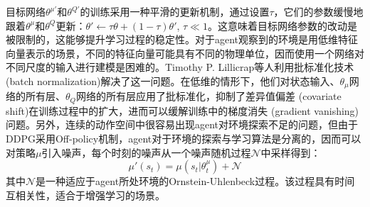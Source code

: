 目标网络$\theta^{\mu'}$和$\theta^{Q'}$的训练采用一种平滑的更新机制，通过设置$\tau$，它们的参数缓慢地跟着$\theta^{\mu}$和$\theta^{Q}$更新：$\theta' \leftarrow \tau\theta + (1 - \tau) \theta'$, $\tau \ll 1$。这意味着目标网络参数的改动是被限制的，这能够提升学习过程的稳定性\cite{timothy2016cont}。对于agent观察到的环境是用低维特征向量表示的场景，不同的特征向量可能具有不同的物理单位，因而使用一个网络对不同尺度的输入进行建模是困难的。Timothy P. Lillicrap等人利用批标准化技术 (batch normalization\cite{ioffe2015batch})解决了这一问题。在低维的情形下，他们对状态输入、$\theta_\mu$网络的所有层、$\theta_Q$网络的所有层应用了批标准化，抑制了差异值偏差 (covariate shift)在训练过程中的扩大，进而可以缓解训练中的梯度消失 (gradient vanishing)问题。另外，连续的动作空间中很容易出现agent对环境探索不足的问题，但由于DDPG采用Off-policy机制，agent对于环境的探索与学习算法是分离的，因而可以对策略$\mu$引入噪声，每个时刻的噪声从一个噪声随机过程$\mathcal{N}$中采样得到：
\begin{equation}
  \mu'(s_t) = \mu(s_t | \theta^\mu_t) + \mathcal{N}
\end{equation}
其中$\mathcal{N}$是一种适应于agent所处环境的Ornstein-Uhlenbeck过程\cite{uhlenbeck1930on}。该过程具有时间互相关性，适合于增强学习的场景。



